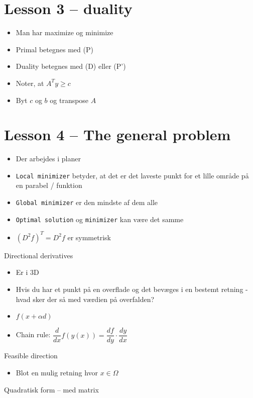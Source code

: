 \documentclass[danish, 10pt]{Memoir}
\begin{document}
\newpage
\section*{Lesson 3 -- duality}

\begin{itemize}
	\item Man har maximize og minimize
	\item Primal betegnes med (P)
	\item Duality betegnes med (D) eller (P')
	\item Noter, at $A^T y \geq c$
	\item Byt $c$ og $b$ og transpose $A$
\end{itemize}






\newpage
\section*{Lesson 4 -- The general problem}

\begin{itemize}
	\item Der arbejdes i planer
	\item \texttt{Local minimizer} betyder, at det er det laveste punkt for et lille område på en parabel / funktion
	\item \texttt{Global minimizer} er den mindste af dem alle
	\item \texttt{Optimal solution} og \texttt{minimizer} kan være det samme
	\item $(D^2 f)^T = D^2 f$ er symmetrisk
\end{itemize}
Directional derivatives

\begin{itemize}
	\item Er i 3D
	\item Hvis du har et punkt på en overflade og det bevæges i en bestemt retning - hvad sker der så med værdien på overfalden?
	\item $f(x+\alpha d)$
	\item Chain rule: $\dfrac{d}{dx} f(y(x)) = \dfrac{df}{dy} \cdot \dfrac{dy}{dx}$
\end{itemize}
Feasible direction

\begin{itemize}
	\item Blot en mulig retning hvor $x \in \Omega$
\end{itemize}
Quadratisk form -- med matrix
\end{document}
